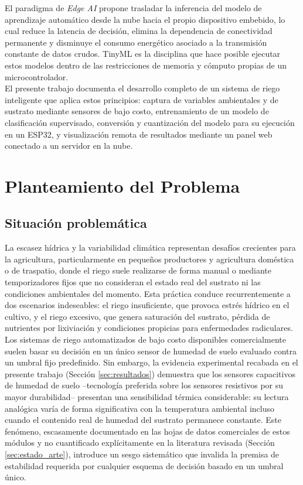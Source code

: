 \documentclass[12pt,a4paper]{article}
\begin{document}
El paradigma de \textit{Edge AI} propone trasladar la inferencia del modelo de aprendizaje automático desde la nube hacia el propio dispositivo embebido, lo cual reduce la latencia de decisión, elimina la dependencia de conectividad permanente y disminuye el consumo energético asociado a la transmisión constante de datos crudos. TinyML es la disciplina que hace posible ejecutar estos modelos dentro de las restricciones de memoria y cómputo propias de un microcontrolador.\\

El presente trabajo documenta el desarrollo completo de un sistema de riego inteligente que aplica estos principios: captura de variables ambientales y de sustrato mediante sensores de bajo costo, entrenamiento de un modelo de clasificación supervisado, conversión y cuantización del modelo para su ejecución en un ESP32, y visualización remota de resultados mediante un panel web conectado a un servidor en la nube.

\section{Planteamiento del Problema}

\subsection{Situación problemática}
La escasez hídrica y la variabilidad climática representan desafíos crecientes para la agricultura, particularmente en pequeños productores y agricultura doméstica o de traspatio, donde el riego suele realizarse de forma manual o mediante temporizadores fijos que no consideran el estado real del sustrato ni las condiciones ambientales del momento. Esta práctica conduce recurrentemente a dos escenarios indeseables: el riego insuficiente, que provoca estrés hídrico en el cultivo, y el riego excesivo, que genera saturación del sustrato, pérdida de nutrientes por lixiviación y condiciones propicias para enfermedades radiculares.\\

Los sistemas de riego automatizados de bajo costo disponibles comercialmente suelen basar su decisión en un único sensor de humedad de suelo evaluado contra un umbral fijo predefinido. Sin embargo, la evidencia experimental recabada en el presente trabajo (Sección \ref{sec:resultados}) demuestra que los sensores capacitivos de humedad de suelo --tecnología preferida sobre los sensores resistivos por su mayor durabilidad-- presentan una sensibilidad térmica considerable: su lectura analógica varía de forma significativa con la temperatura ambiental incluso cuando el contenido real de humedad del sustrato permanece constante. Este fenómeno, escasamente documentado en las hojas de datos comerciales de estos módulos y no cuantificado explícitamente en la literatura revisada (Sección \ref{sec:estado_arte}), introduce un sesgo sistemático que invalida la premisa de estabilidad requerida por cualquier esquema de decisión basado en un umbral único.\\
\end{document}
